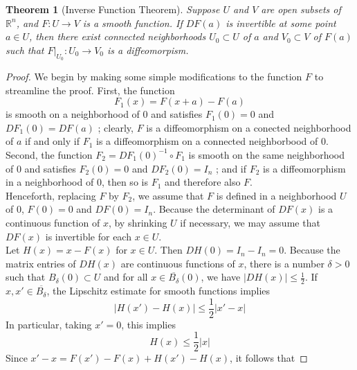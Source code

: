 \documentclass[reqno]{amsart}
\theoremstyle{plain}%
\newtheorem{theorem}{Theorem}[section]
\theoremstyle{definition}
\theoremstyle{remark}
\begin{document}
        \begin{theorem}[Inverse Function Theorem]\label{inverse-function-thm}
        Suppose $U$ and $V$ are open subsets of $\mathbb{R}^{n}$, and
        $F  \colon U \to V$ is a smooth function. If $DF(a)$ is invertible at some
        point $a \in U$, then there exist connected neighborhoods
        $U_0 \subset U$ of $a$ and $V_0 \subset V$ of $F(a)$ such that
        $F|_{U_0}  \colon U_0 \to V_0$ is a diffeomorpism.
        \end{theorem}

        \begin{proof}
        We begin by making some simple modifications to the function $F$ to
        streamline the proof. First, the function
        \[
        F_1 (x) = F(x+a)-F(a)
        \] 
        is smooth on a neighborhood of $0$ and satisfies $F_1(0) = 0$ and
        $DF_1 (0) = DF(a)$ ; clearly, $F$ is a diffeomorphism on a conected
        neighborhood of $a$ if and only if $F_1$ is a diffeomorphism on a connected
        neighborbood of $0$. Second, the function $F_2 = 
        DF_1(0)^{-1} \circ F_1$ is smooth on the same neighborhood of $0$ and
        satisfies $F_2(0) = 0$ and $DF_2(0) = I_n$ ; and if $F_2$ is
        a diffeomorphism in a neighborhood of $0$, then so is $F_1$ and therefore
        also $F$.\\
        Henceforth, replacing $F$ by $F_2$, we assume that $F$ is defined in
        a neighborhood $U$ of $0$, $F(0)=0$ and $DF(0)=I_n$. Because the
        determinant of $DF(x)$ is a continuous function of $x$, by shrinking $U$ if
        necessary, we may assume that $DF(x)$ is invertible for each $x \in U$.\\
        Let $H(x) = x - F(x)$ for $x \in U$. Then $DH(0) = I_n - I_n = 0$.
        Because the matrix entries of $DH(x)$ are continuous functions of $x$,
        there is a number $\delta > 0$ such that $B_{\delta}(0) \subset U$ and for
        all $x \in \overline{B_{\delta}}(0)$, we have $\left| DH(x) \right| \le
        \frac{1}{2}$. If $x, x' \in \overline{B_{\delta}}$, the Lipschitz estimate
        for smooth functions implies
        \[
            \left| H(x') - H(x)  \right| \le \frac{1}{2} \left| x' -x \right|
            \tag{$\alpha$} \label{eq:inverse-function-thm-c15}
        \] 
        In particular, taking $x' =0$, this implies
        \[
            H(x) \le \frac{1}{2} \left| x \right| \tag{$\omega
            $}\label{eq:inverse-function-thm-c16}
        \] 
        Since $x' - x = F(x') - F(x) + H(x') - H(x)$, it follows that

\end{proof}
\end{document}
